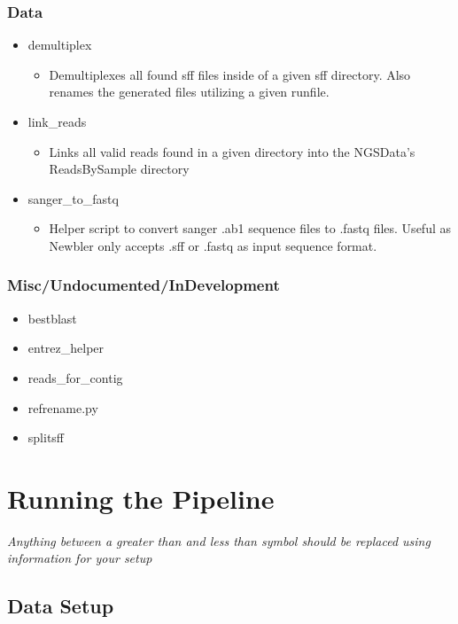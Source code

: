 \documentclass{article}
\begin{document}
\subsubsection{Data}
 \begin{itemize}
  \item demultiplex
   \begin{itemize}
    \item Demultiplexes all found sff files inside of a given sff directory. Also renames the generated files utilizing a given runfile.
   \end{itemize}
  \item link\_reads
   \begin{itemize}
    \item Links all valid reads found in a given directory into the NGSData's ReadsBySample directory
   \end{itemize}
  \item sanger\_to\_fastq
   \begin{itemize}
    \item Helper script to convert sanger .ab1 sequence files to .fastq files. Useful as Newbler only accepts .sff or .fastq as input sequence format.
   \end{itemize}
 \end{itemize}
\subsubsection{Misc/Undocumented/InDevelopment}
 \begin{itemize}
  \item bestblast
  \item entrez\_helper
  \item reads\_for\_contig
  \item refrename.py
  \item splitsff
 \end{itemize}

\section{Running the Pipeline}

\textit{Anything between a greater than and less than symbol should be replaced using information for your setup}

\subsection{Data Setup}
\end{document}
